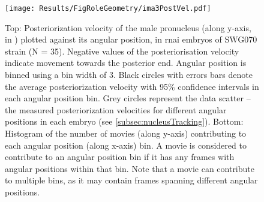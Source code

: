 \begin{figure}[p]
\centering
\texttt{[image: Results/FigRoleGeometry/ima3PostVel.pdf]}
\caption[Experimentally observed posteriorisation velocity of the male pronucleus in  \acs{rnai} embryos]{Top: Posteriorization velocity of the male pronucleus (along y-axis, in \si{\unitPostVel}) plotted against its angular position, in  \ac{rnai} embryos of SWG070 strain (N = 35). Negative values of the posteriorisation velocity indicate movement towards the posterior end. Angular position is binned using a bin width of \SI{3}{\unitAngle}. Black circles with errors bars denote the average posteriorization velocity with \num{95}\% confidence intervals in each angular position bin. Grey circles represent the data scatter -- the measured posteriorization velocities for different angular positions in each embryo (see \autoref{subsec:nucleusTracking}). Bottom: Histogram of the number of movies (along y-axis) contributing to each angular position (along x-axis) bin. A movie is considered to contribute to an angular position bin if it has any frames with angular positions within that bin. Note that a movie can contribute to multiple bins, as it may contain frames spanning different angular positions.}
\label{fig:swg070Ima3PostVelVsAngle}
\end{figure}

